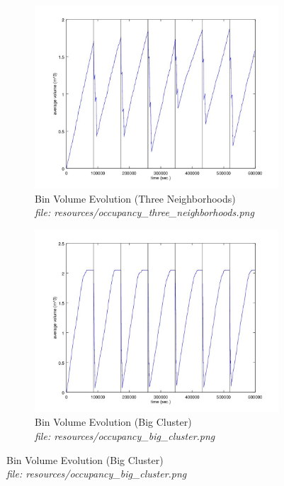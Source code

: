 \documentclass{article}
\begin{document}
		\begin{figure}[H]
			\centering
			\begin{subfigure}[b]{.5\columnwidth}
				\includegraphics[width=\textwidth]{resources/occupancy_three_neighborhoods.jpg}
				\caption{Bin Volume Evolution (Three Neighborhoods) \\\textit{file: resources/occupancy\_three\_neighborhoods.png}}
				\label{fig:fig6a}
			\end{subfigure}\hfill%
			\begin{subfigure}[b]{.5\columnwidth}
				\includegraphics[width=\textwidth]{resources/occupancy_big_cluster.jpg}
				\caption{Bin Volume Evolution (Big Cluster) \\\textit{file: resources/occupancy\_big\_cluster.png}}
				\label{fig:fig6b}
			\end{subfigure}
			\label{fig:fig6}
		\end{figure}



			
\end{document}
